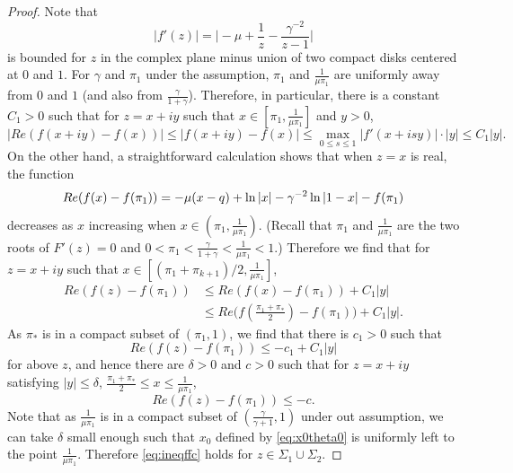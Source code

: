 \documentclass[11pt]{article}
\begin{document}
\begin{proof}
Note that
\begin{equation}
  |f'(z)| = \biggl|-\mu +\frac1{z}-\frac{\gamma^{-2}}{z-1}
  \biggr|
\end{equation}
is bounded for $z$ in the complex plane minus union of two compact
disks centered at $0$ and $1$. For $\gamma$ and $\pi_1$ under the
assumption, $\pi_1$ and $\frac{1}{\mu\pi_1}$ are uniformly away
from $0$ and $1$ (and also from $\frac{\gamma}{1+\gamma}$).
Therefore, in particular, there is a constant $C_1>0$ such that
for $z=x+iy$ such that $x\in [\pi_1,\frac1{\mu\pi_1}]$ and $y>0$,
\begin{equation}
  |Re(f(x+iy)-f(x))| \le |f(x+iy)-f(x)| \le \max_{0\le s\le 1} |f'(x+isy)|\cdot |y|
  \le C_1|y|.
\end{equation}
On the other hand, a straightforward calculation shows that when
$z=x$ is real, the function
\begin{equation}
  Re(f(x)-f(\pi_1)) = -\mu(x-q) + \ln|x| - \gamma^{-2}
  \ln|1-x| - f(\pi_1)
\end{equation}
decreases as $x$ increasing when $x\in (\pi_1, \frac{1}{\mu
\pi_1})$. (Recall that $\pi_1$ and $\frac1{\mu\pi_1}$ are the two
roots of $F'(z)=0$ and $0<\pi_1<\frac{\gamma}{1+\gamma} <
\frac1{\mu \pi_1}<1$.) Therefore we find that for $z=x+iy$ such
that $x\in [(\pi_1+\pi_{k+1})/2, \frac1{\mu\pi_1}]$,
\begin{equation}
\begin{split}
  Re(f(z)-f(\pi_1)) &\le Re(f(x)-f(\pi_1))+ C_1 |y| \\
  &\le Re \bigl(f(\frac{\pi_1+\pi_*}2) - f(\pi_1) \bigr)+ C_1 |y| .
\end{split}
\end{equation}
As $\pi_*$ is in a compact subset of $(\pi_1, 1)$, we find that
there is $c_1>0$ such that
\begin{equation}
  Re(f(z)-f(\pi_1)) \le -c_1 + C_1|y|
\end{equation}
for above $z$, and hence there are $\delta>0$ and $c>0$ such that
for $z=x+iy$ satisfying $|y|\le \delta$, $\frac{\pi_1+\pi_*}2\le
x\le \frac1{\mu \pi_1}$,
\begin{equation}\label{eq:ineqffc}
  Re(f(z)-f(\pi_1)) \le -c.
\end{equation}
Note that as $\frac1{\mu \pi_1}$ is in a compact subset of
$(\frac{\gamma}{\gamma+1}, 1)$ under out assumption, we can take
$\delta$ small enough such that $x_0$ defined by
\eqref{eq:x0theta0} is uniformly left to the point $\frac1{\mu
\pi_1}$. Therefore \eqref{eq:ineqffc} holds for
$z\in\Sigma_1\cup\Sigma_2$.


\end{proof}
\end{document}
